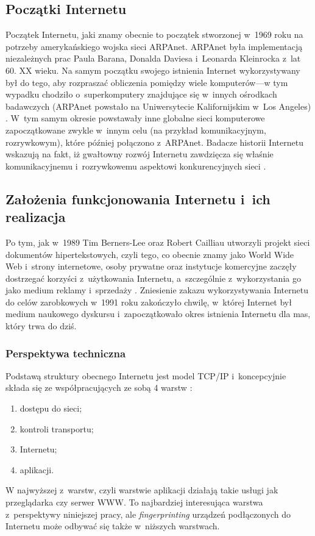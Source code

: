 \subsection{Początki Internetu}
Początek Internetu, jaki znamy obecnie to początek stworzonej w~1969 roku na
potrzeby amerykańskiego wojska sieci ARPAnet. ARPAnet była implementacją
niezależnych prac Paula Barana, Donalda Daviesa i~Leonarda Kleinrocka z~lat 60.
XX wieku. Na samym początku swojego istnienia Internet wykorzystywany był do
tego, aby rozpraszać obliczenia pomiędzy wiele komputerów---w tym wypadku
chodziło o~superkomputery znajdujące się w~innych ośrodkach badawczych (ARPAnet
powstało na Uniwersytecie Kalifornijskim w~Los Angeles) \cite{press2015very}.
W~tym samym okresie powstawały inne globalne sieci komputerowe zapoczątkowane
zwykle w~innym celu (na przykład komunikacyjnym, rozrywkowym), które później
połączono z~ARPAnet. Badacze historii Internetu wskazują na fakt, iż gwałtowny
rozwój Internetu zawdzięcza się właśnie komunikacyjnemu i~rozrywkowemu aspektowi
konkurencyjnych sieci \cite{maigret2012socjologia}.

\subsection{Założenia funkcjonowania Internetu i~ich realizacja}
Po tym, jak w~1989 Tim Berners-Lee oraz Robert Cailliau utworzyli projekt sieci
dokumentów hipertekstowych, czyli tego, co obecnie znamy jako World Wide Web
i~strony internetowe, osoby prywatne oraz instytucje komercyjne zaczęły
dostrzegać korzyści z~użytkowania Internetu, a~szczególnie z~wykorzystania go
jako medium reklamy i~sprzedaży \cite{press2015very}. Zniesienie zakazu
wykorzystywania Internetu do celów zarobkowych w~1991 roku zakończyło chwilę,
w~której Internet był medium naukowego dyskursu i~zapoczątkowało okres istnienia
Internetu dla mas, który trwa do dziś.

\subsubsection{Perspektywa techniczna}
Podstawą struktury obecnego Internetu jest model TCP/IP i~koncepcyjnie składa
się ze współpracujących ze sobą 4 warstw \cite{kahn1974protocol}:
\begin{enumerate}
	\item dostępu do sieci;
	\item kontroli transportu;
	\item Internetu;
	\item aplikacji.
\end{enumerate}
W najwyższej z~warstw, czyli warstwie aplikacji działają takie usługi jak
przeglądarka czy serwer WWW. To najbardziej interesująca warstwa z~perspektywy
niniejszej pracy, ale \emph{fingerprinting} urządzeń podłączonych do Internetu
może odbywać się także w~niższych warstwach. %

